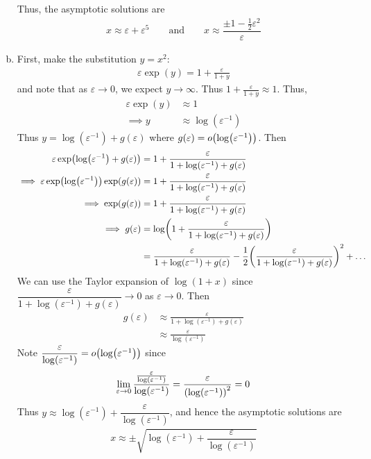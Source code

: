 \documentclass{article} %
\theoremstyle{plain}
\newcommand{\E}{\varepsilon}
\numberwithin{equation}{section} %
\numberwithin{figure}{section} %
\numberwithin{table}{section} %
\begin{document}
\begin{enumerate}[(a)]
\begin{itemize}
        \end{itemize}
        Thus, the asymptotic solutions are
        \begin{align*}
            \boxed{x \approx \E + \E^5 \qquad \text{and} \qquad x \approx \dfrac{\pm 1 - \frac{1}{2}\E^2}{\E}}
        \end{align*}
    \item
        First, make the substitution $y = x^2$:
        \begin{align*}
            \E \exp(y) = 1 + \frac{\E}{1 + y}
        \end{align*}
        and note that as $\E \rightarrow 0$, we expect $y \rightarrow \infty$.  Thus $1 + \frac{\E}{1 + y} \approx 1$.  Thus,
        \begin{align*}
            \E \exp(y) &\approx 1 \\
            \implies y &\approx \log(\E^{-1})
        \end{align*}
        Thus $y = \log(\E^{-1}) + g(\E)$ where $g(\E) = o\qty(\log(\E^{-1}))$.  Then
        \begin{align*}
            \E\exp(\log(\E^{-1}) + g(\E)) &= 1 + \frac{\E}{1 + \log(\E^{-1}) + g(\E)} \\
            \implies \E\exp(\log(\E^{-1}))\exp(g(\E)) &= 1 + \frac{\E}{1 + \log(\E^{-1}) + g(\E)} \\
            \implies \exp(g(\E)) &= 1 + \frac{\E}{1 + \log(\E^{-1}) + g(\E)} \\
            \implies g(\E) &= \log(1 + \frac{\E}{1 + \log(\E^{-1}) + g(\E)}) \\
            &= \frac{\E}{1 + \log(\E^{-1}) + g(\E)} - \frac{1}{2}\qty(\frac{\E}{1 + \log(\E^{-1}) + g(\E)})^2 + \dots
        \end{align*}
        We can use the Taylor expansion of $\log(1 + x)$ since $\dfrac{\E}{1 + \log(\E^{-1}) + g(\E)} \rightarrow 0$ as $\E \rightarrow 0$.  Then
        \begin{align*}
            g(\E) &\approx \frac{\E}{1 + \log(\E^{-1}) + g(\E)} \\
            &\approx \frac{\E}{\log(\E^{-1})}
        \end{align*}
        Note $\dfrac{\E}{\log(\E^{-1})} = o\qty(\log(\E^{-1}))$ since
        \begin{align*}
            \lim_{\E \rightarrow 0} \frac{\frac{\E}{\log(\E^{-1})}}{\log(\E^{-1})} = \frac{\E}{\qty(\log(\E^{-1}))^2} = 0
        \end{align*}
        Thus $y \approx \log(\E^{-1}) + \dfrac{\E}{\log(\E^{-1})}$, and hence the asymptotic solutions are
        \begin{align*}
            \boxed{x \approx \pm \sqrt{\log(\E^{-1}) + \dfrac{\E}{\log(\E^{-1})}}}
        \end{align*}
\end{enumerate}
\end{document}
